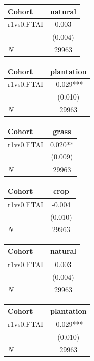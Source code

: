 {
\def\sym#1{\ifmmode^{#1}\else\(^{#1}\)\fi}
\begin{tabular}{l*{1}{c}}
\toprule
Cohort    &  natural   \\
\midrule
r1vs0.FTAI&    0.003   \\
          &  (0.004)   \\
\midrule
\(N\)     &    29963   \\
\bottomrule
\end{tabular}
}
{
\def\sym#1{\ifmmode^{#1}\else\(^{#1}\)\fi}
\begin{tabular}{l*{1}{c}}
\toprule
Cohort    &plantation   \\
\midrule
r1vs0.FTAI&   -0.029***\\
          &  (0.010)   \\
\midrule
\(N\)     &    29963   \\
\bottomrule
\end{tabular}
}
{
\def\sym#1{\ifmmode^{#1}\else\(^{#1}\)\fi}
\begin{tabular}{l*{1}{c}}
\toprule
Cohort    &    grass   \\
\midrule
r1vs0.FTAI&    0.020** \\
          &  (0.009)   \\
\midrule
\(N\)     &    29963   \\
\bottomrule
\end{tabular}
}
{
\def\sym#1{\ifmmode^{#1}\else\(^{#1}\)\fi}
\begin{tabular}{l*{1}{c}}
\toprule
Cohort    &     crop   \\
\midrule
r1vs0.FTAI&   -0.004   \\
          &  (0.010)   \\
\midrule
\(N\)     &    29963   \\
\bottomrule
\end{tabular}
}
{
\def\sym#1{\ifmmode^{#1}\else\(^{#1}\)\fi}
\begin{tabular}{l*{1}{c}}
\toprule
Cohort    &  natural   \\
\midrule
r1vs0.FTAI&    0.003   \\
          &  (0.004)   \\
\midrule
\(N\)     &    29963   \\
\bottomrule
\end{tabular}
}
{
\def\sym#1{\ifmmode^{#1}\else\(^{#1}\)\fi}
\begin{tabular}{l*{1}{c}}
\toprule
Cohort    &plantation   \\
\midrule
r1vs0.FTAI&   -0.029***\\
          &  (0.010)   \\
\midrule
\(N\)     &    29963   \\
\bottomrule
\end{tabular}
}
